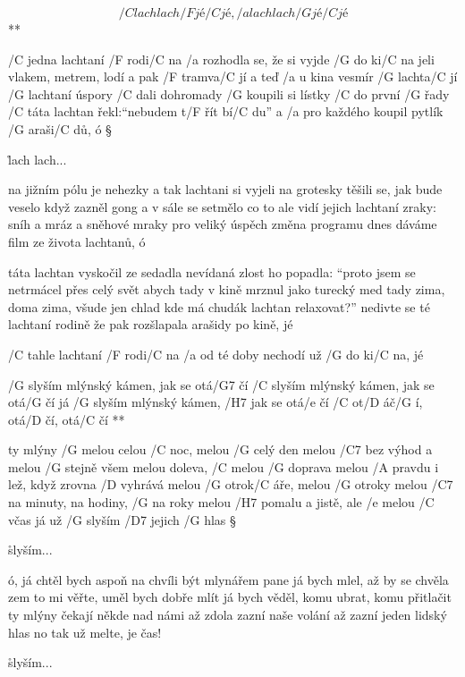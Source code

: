 
\R  \[ /C lach lach /F jé /C jé, /a lach lach /G jé /C jé \] **

/C jedna lachtaní /F rodi/C na
/a rozhodla se, že si vyjde /G do ki/C na
jeli vlakem, metrem, lodí a pak /F tramva/C jí
a teď /a u kina vesmír /G lachta/C jí
/G lachtaní úspory /C dali dohromady
/G koupili si lístky /C do první /G řady
/C táta lachtan řekl:``nebudem t/F řít bí/C du''
a /a pro každého koupil pytlík /G araši/C dů, ó \S

\r  lach lach...

na jižním pólu je nehezky
a tak lachtani si vyjeli na grotesky
těšili se, jak bude veselo
když zazněl gong a v sále se setmělo
co to ale vidí jejich lachtaní zraky:
sníh a mráz a sněhové mraky
pro veliký úspěch změna programu
dnes dáváme film ze života lachtanů, ó

\rr

táta lachtan vyskočil ze sedadla
nevídaná zlost ho popadla:
``proto jsem se netrmácel přes celý svět
abych tady v kině mrznul jako turecký med
tady zima, doma zima, všude jen chlad
kde má chudák lachtan relaxovat?''
nedivte se té lachtaní rodině
že pak rozšlapala arašidy po kině, jé

\rr

/C tahle lachtaní /F rodi/C na
/a od té doby nechodí už /G do ki/C na, jé




\R /G slyším mlýnský kámen, jak se otá/G7 čí
   /C slyším mlýnský kámen, jak se otá/G čí
   já /G slyším mlýnský kámen, /H7 jak se otá/e čí
   /C ot/D áč/G í, otá/D čí, otá/C čí **

ty mlýny /G melou celou /C noc, melou /G celý den
melou /C7 bez výhod a melou /G stejně všem
melou doleva, /C melou /G doprava
melou /A pravdu i lež, když zrovna /D vyhrává
melou /G otrok/C áře, melou /G otroky
melou /C7 na minuty, na hodiny, /G na roky
melou /H7 pomalu a jistě, ale /e melou /C včas
já už /G slyším /D7 jejich /G hlas \S

\r slyším...

ó, já chtěl bych aspoň na chvíli být mlynářem
pane já bych mlel, až by se chvěla zem
to mi věřte, uměl bych dobře mlít
já bych věděl, komu ubrat, komu přitlačit
ty mlýny čekají někde nad námi
až zdola zazní naše volání
až zazní jeden lidský hlas
no tak už melte, je čas! \s

\r slyším...



